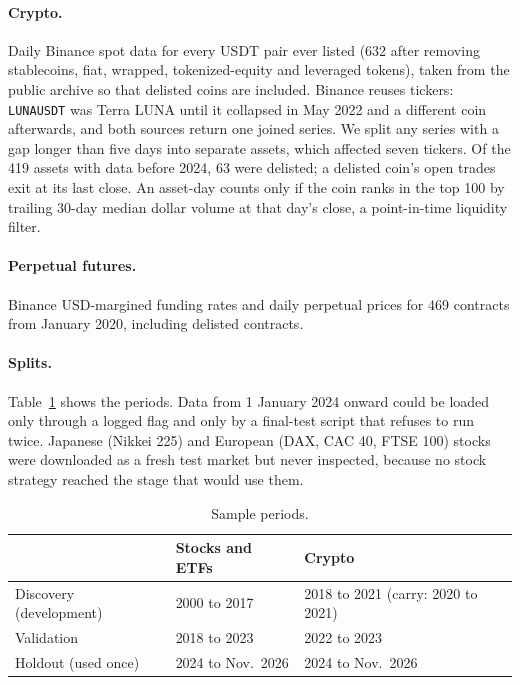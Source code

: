 \documentclass[11pt]{article}
\begin{document}
\paragraph{Crypto.} Daily Binance spot data for every USDT pair ever listed (632 after removing
stablecoins, fiat, wrapped, tokenized-equity and leveraged tokens), taken from the public archive
so that delisted coins are included. Binance reuses tickers: \texttt{LUNAUSDT} was Terra LUNA
until it collapsed in May 2022 and a different coin afterwards, and both sources return one joined
series. We split any series with a gap longer than five days into separate assets, which affected
seven tickers. Of the 419 assets with data before 2024, 63 were delisted; a delisted coin's open
trades exit at its last close. An asset-day counts only if the coin ranks in the top 100 by
trailing 30-day median dollar volume at that day's close, a point-in-time liquidity filter.

\paragraph{Perpetual futures.} Binance USD-margined funding rates and daily perpetual prices for 469
contracts from January 2020, including delisted contracts.

\paragraph{Splits.} Table~\ref{tab:splits} shows the periods. Data from 1 January 2024 onward could
be loaded only through a logged flag and only by a final-test script that refuses to run twice.
Japanese (Nikkei 225) and European (DAX, CAC 40, FTSE 100) stocks were downloaded as a fresh test
market but never inspected, because no stock strategy reached the stage that would use them.

\begin{table}[h]
\centering\small
\caption{Sample periods.}\label{tab:splits}
\begin{tabular}{lll}
\toprule
 & Stocks and ETFs & Crypto \\
\midrule
Discovery (development) & 2000 to 2017 & 2018 to 2021 (carry: 2020 to 2021) \\
Validation & 2018 to 2023 & 2022 to 2023 \\
Holdout (used once) & 2024 to Nov.\ 2026 & 2024 to Nov.\ 2026 \\
\bottomrule
\end{tabular}
\end{table}
\end{document}
